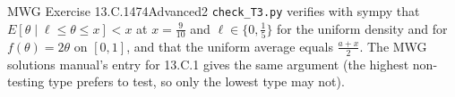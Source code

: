 \begin{exsol}{MWG Exercise 13.C.1}{474}{Advanced}{2}
\verify \texttt{check\_T3.py} verifies with sympy that $E[\theta \mid \ell \le \theta \le x] < x$ at $x = \frac9{10}$ and $\ell \in \{0, \frac15\}$ for
the uniform density and for $f(\theta) = 2\theta$ on $[0,1]$, and that the uniform average equals
$\frac{a + x}{2}$. The MWG solutions manual's entry for 13.C.1 gives the same argument (the highest
non-testing type prefers to test, so only the lowest type may not).

\end{exsol}

